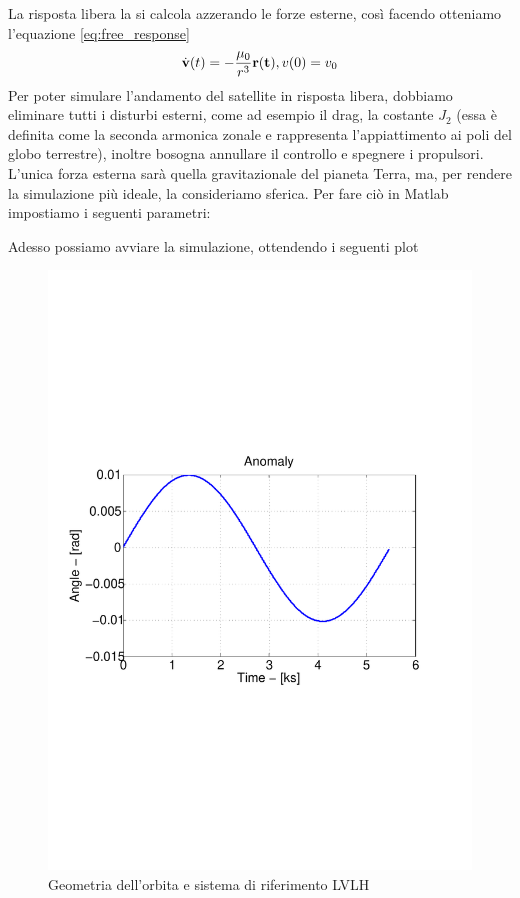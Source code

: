 La risposta libera la si calcola azzerando le forze esterne, così facendo
otteniamo l'equazione \ref{eq:free_response}
\begin{equation}
\dot{\bf v}(t)=-\frac{\mu_0}{r^3}{\bf r(t)}, v(0)=v_0 \nonumber
\end{equation}
Per poter simulare l'andamento del satellite in risposta libera, dobbiamo
eliminare tutti i disturbi esterni, come ad esempio il drag, la costante $J_2$
(essa è definita come la seconda armonica zonale e rappresenta l'appiattimento
ai poli del globo terrestre), inoltre bosogna annullare il controllo e spegnere
i propulsori. L'unica forza esterna sarà quella gravitazionale del pianeta
Terra, ma, per rendere la simulazione più ideale, la consideriamo sferica. Per
fare ciò in Matlab impostiamo i seguenti parametri:


Adesso possiamo avviare la simulazione, ottendendo i seguenti plot


\begin{figure}[h]
\begin{center}
  \includegraphics[width=\textwidth,clip=true,trim=2cm
  9cm 2cm 9cm]{modelling/orbit_dynamics/image/anomaly.pdf}
  \caption{Geometria dell'orbita e sistema di riferimento LVLH}
  \label{fig:LVLH}
\end{center}
\end{figure}
